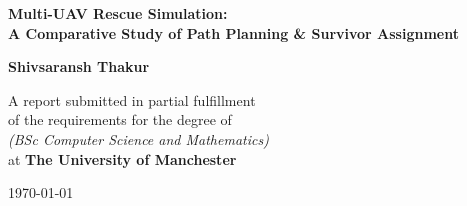 \documentclass[12pt,a4paper]{report}
\begin{document}
\begin{titlepage}
    \begin{center}
        \vspace*{1cm}
        
        {\LARGE \textbf{Multi-UAV Rescue Simulation:}\\
        \vspace{0.3em}
        \textbf{A Comparative Study of Path Planning \& Survivor Assignment}}

        \vspace{2cm}
        \textbf{Shivsaransh Thakur}

        \vfill

        A report submitted in partial fulfillment \\
        of the requirements for the degree of \\
        \emph{(BSc Computer Science and Mathematics)} \\
        at \textbf{The University of Manchester}

        \vspace{1.5cm}
        \today

        \vfill
    \end{center}
\end{titlepage}
\end{document}

